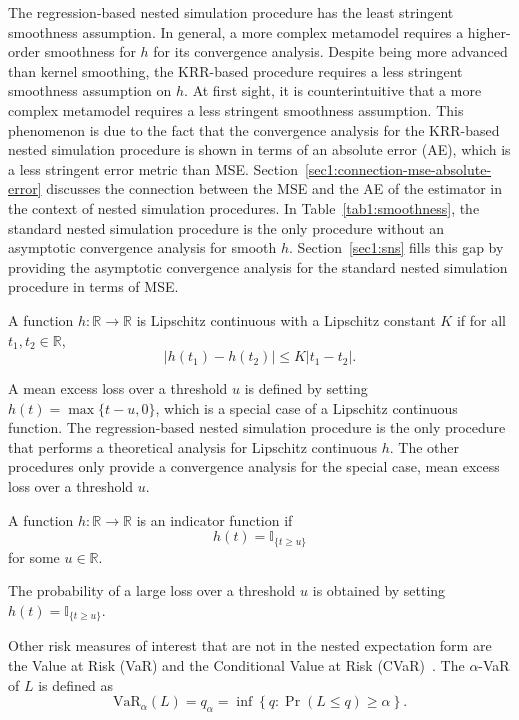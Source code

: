 The regression-based nested simulation procedure has the least stringent smoothness assumption.
In general, a more complex metamodel requires a higher-order smoothness for $h$ for its convergence analysis.
Despite being more advanced than kernel smoothing, the KRR-based procedure requires a less stringent smoothness assumption on $h$.
At first sight, it is counterintuitive that a more complex metamodel requires a less stringent smoothness assumption.
This phenomenon is due to the fact that the convergence analysis for the KRR-based nested simulation procedure is shown in terms of an absolute error (AE), which is a less stringent error metric than MSE.
Section~\ref{sec1:connection-mse-absolute-error} discusses the connection between the MSE and the AE of the estimator in the context of nested simulation procedures.
In Table~\ref{tab1:smoothness}, the standard nested simulation procedure is the only procedure without an asymptotic convergence analysis for smooth $h$.
Section~\ref{sec1:sns} fills this gap by providing the asymptotic convergence analysis for the standard nested simulation procedure in terms of MSE.

\begin{definition} \label{def1:lipschitz}
    A function $h: \mathbb{R} \rightarrow \mathbb{R}$ is Lipschitz continuous with a Lipschitz constant $K$ if for all $t_1, t_2 \in \mathbb{R}$, 
    $$|h(t_1) - h(t_2)| \leq K|t_1 - t_2|.$$
\end{definition}

A mean excess loss over a threshold $u$ is defined by setting $h(t) = \max\{t - u, 0\}$, which is a special case of a Lipschitz continuous function.
The regression-based nested simulation procedure is the only procedure that performs a theoretical analysis for Lipschitz continuous $h$.
The other procedures only provide a convergence analysis for the special case, mean excess loss over a threshold $u$.

\begin{definition} \label{def1:indicator}
    A function $h: \mathbb{R} \rightarrow \mathbb{R}$ is an indicator function if 
    $$h(t) = \mathbb{I}_{\{t \geq u\}}$$
    for some $u \in \mathbb{R}$.
\end{definition}

The probability of a large loss over a threshold $u$ is obtained by setting $h(t) = \mathbb{I}_{\{t \geq u\}}$.

Other risk measures of interest that are not in the nested expectation form are the Value at Risk (VaR) and the Conditional Value at Risk (CVaR)~\citep{hardy2022quantitative}. 
The $\alpha$-VaR of $L$ is defined as
\begin{equation} \label{eq1:var}
    \mbox{VaR}_\alpha(L) = q_\alpha = \inf \left\{ q: \Pr(L\leq q) \geq \alpha \right\}.
\end{equation}
    

